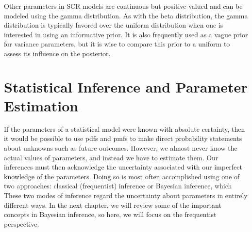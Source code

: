 Other parameters in SCR models are continuous but
positive-valued and can be modeled using the gamma distribution. As
with the beta distribution, the gamma distribution is typically
favored over the uniform distribution when one is interested in using
an informative prior. It is also frequently used as a vague prior for
variance parameters, but it is wise to compare this prior to a uniform
to assess its influence on the posterior.

\section{Statistical Inference and Parameter Estimation}

If the parameters of a statistical model were known with absolute
certainty, then it would be possible to
use pdfs and pmfs to make direct
probability statements about unknowns such as future outcomes. However, we
almost never know the actual values of parameters, and instead we have
to estimate them. Our inferences must then acknowledge the uncertainty
associated with our imperfect knowledge of the parameters. Doing so is
most often accomplished using one of two approaches:
classical (frequentist) inference or Bayesian
inference, which
These two modes of inference
regard the uncertainty about parameters in
entirely different ways. In the next chapter, we will review some of
the important concepts in Bayesian inference, so here, we will
focus on the frequentist perspective.

